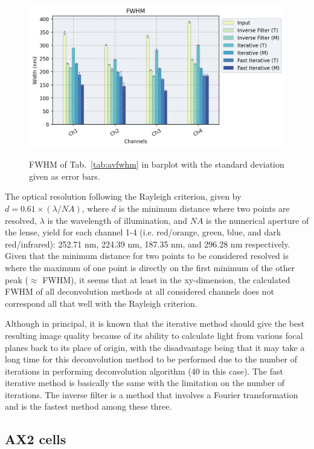 \begin{figure}[h!]
\centering
\includegraphics[width=.9\columnwidth]{Exp_7_Deconvolution/Figures/av_tabnmerr7}\\
\caption{FWHM of Tab.~\ref{tab:avfwhm} in barplot with the standard deviation given as error bars.}
\label{fig:avfwhmbar}
\end{figure}

The optical resolution following the Rayleigh criterion, given by $d=0.61\times(\lambda/NA)$, where $d$ is the minimum distance where two points are resolved, $\lambda$ is the wavelength of illumination, and $NA$ is the numerical aperture of the lense, yield for each channel 1-4 (i.e. red/orange, green, blue, and dark red/infrared): 252.71 nm, 224.39 nm, 187.35 nm, and 296.28 nm respectively. 
Given that the minimum distance for two points to be considered resolved is where the maximum of one point is directly on the first minimum of the other peak ($\approx$ FWHM), it seems that at least in the xy-dimension, the calculated FWHM of all deconvolution methods at all considered channels does not correspond all that well with the Rayleigh criterion.
 
Although in principal, it is known that the iterative method should give the best resulting image quality because of its ability to calculate light from various focal planes back to its place of origin, with the disadvantage being that it may take a long time for this deconvolution method to be performed due to the number of iterations in performing deconvolution algorithm (40 in this case). 
The fast iterative method is basically the same with the limitation on the number of iterations. 
The inverse filter is a method that involves a Fourier transformation and is the fastest method among these three.


\subsection{AX2 cells}

